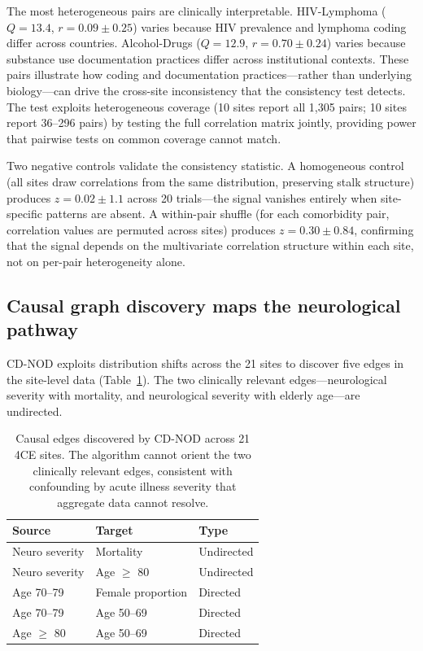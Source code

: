 \documentclass{article}
\begin{document}
The most heterogeneous pairs are clinically interpretable.
HIV-Lymphoma ($Q = 13.4$, $r = 0.09 \pm 0.25$) varies because HIV prevalence and lymphoma coding differ across countries.
Alcohol-Drugs ($Q = 12.9$, $r = 0.70 \pm 0.24$) varies because substance use documentation practices differ across institutional contexts.
These pairs illustrate how coding and documentation practices---rather than underlying biology---can drive the cross-site inconsistency that the consistency test detects.
The test exploits heterogeneous coverage (10 sites report all 1,305 pairs; 10 sites report 36--296 pairs) by testing the full correlation matrix jointly, providing power that pairwise tests on common coverage cannot match.

Two negative controls validate the consistency statistic.
A homogeneous control (all sites draw correlations from the same distribution, preserving stalk structure) produces $z = 0.02 \pm 1.1$ across 20 trials---the signal vanishes entirely when site-specific patterns are absent.
A within-pair shuffle (for each comorbidity pair, correlation values are permuted across sites) produces $z = 0.30 \pm 0.84$, confirming that the signal depends on the multivariate correlation structure within each site, not on per-pair heterogeneity alone.


\subsection{Causal graph discovery maps the neurological pathway}

CD-NOD \cite{huang2020cdnod} exploits distribution shifts across the 21 sites to discover five edges in the site-level data (Table~\ref{tab:cdnod}).
The two clinically relevant edges---neurological severity with mortality, and neurological severity with elderly age---are undirected.

\begin{table}[t]
\centering
\caption{Causal edges discovered by CD-NOD across 21 4CE sites. The algorithm cannot orient the two clinically relevant edges, consistent with confounding by acute illness severity that aggregate data cannot resolve.}
\label{tab:cdnod}
\begin{tabular}{lll}
\toprule
Source & Target & Type \\
\midrule
Neuro severity & Mortality & Undirected \\
Neuro severity & Age $\geq$ 80 & Undirected \\
Age 70--79 & Female proportion & Directed \\
Age 70--79 & Age 50--69 & Directed \\
Age $\geq$ 80 & Age 50--69 & Directed \\
\bottomrule
\end{tabular}
\end{table}
\end{document}
